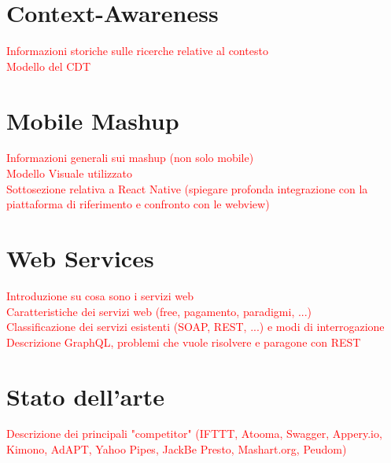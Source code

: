 \section{Context-Awareness\label{sec:context-awareness}}

\textcolor{red}{Informazioni storiche sulle ricerche relative al contesto\\
Modello del CDT}

\section{Mobile Mashup\label{sec:mobile-mashup}}

\textcolor{red}{Informazioni generali sui mashup (non solo mobile)\\
Modello Visuale utilizzato\\
Sottosezione relativa a React Native (spiegare profonda integrazione con la piattaforma di riferimento e confronto con le webview)}

\section{Web Services\label{sec:web-services}}

\textcolor{red}{Introduzione su cosa sono i servizi web\\
Caratteristiche dei servizi web (free, pagamento, paradigmi, ...)\\
Classificazione dei servizi esistenti (SOAP, REST, ...) e modi di interrogazione\\
Descrizione GraphQL, problemi che vuole risolvere e paragone con REST}

\section{Stato dell'arte\label{sec:stato-arte}}

\textcolor{red}{Descrizione dei principali "competitor" (IFTTT, Atooma, Swagger, Appery.io, Kimono, AdAPT, Yahoo Pipes, JackBe Presto, Mashart.org, Peudom)}